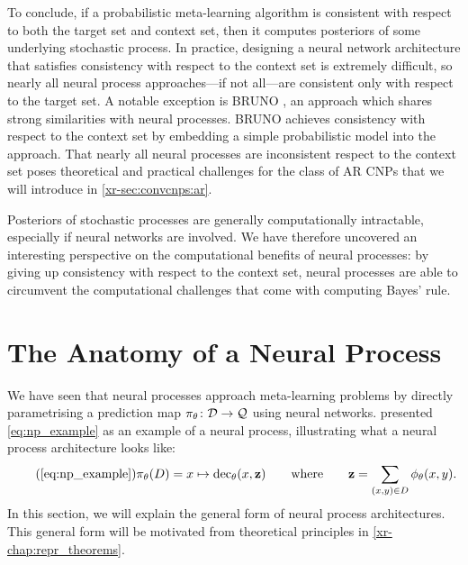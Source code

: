 \documentclass[12pt, twoside]{report}
\newcommand{\xrprefix}[1]{xr-#1}
\begin{document}
To conclude, if a probabilistic meta-learning algorithm is consistent with respect to both the target set and context set,
then it computes posteriors of some underlying stochastic process.
In practice, designing a neural network architecture that satisfies consistency with respect to the context set is extremely difficult, so nearly all neural process approaches---if not all---are consistent only with respect to the target set.
A notable exception is BRUNO \parencite{Korshunova:2018:BRUNO_A_Deep_Recurrent_Model,Korshunova:2020:Conditional_BRUNO_A_Neural_Process}, an approach which shares strong similarities with neural processes.
BRUNO achieves consistency with respect to the context set by embedding a simple probabilistic model into the approach.
That nearly all neural processes are inconsistent respect to the context set
poses theoretical and practical challenges for the class of AR CNPs
that we will introduce in \cref{\xrprefix{sec:convcnps:ar}}.

Posteriors of stochastic processes are generally computationally intractable, especially if neural networks are involved.
We have therefore uncovered an interesting perspective on the computational benefits of neural processes:
by giving up consistency with respect to the context set, neural processes are able to circumvent the 
 computational challenges that come with computing Bayes' rule.

\pagebreak
\section{The Anatomy of a Neural Process}
\label{sec:nps:anatomy}

We have seen that neural processes approach meta-learning problems by directly parametrising a prediction map $\pi_\theta \colon \mathcal{D} \to \mathcal{Q}$ using neural networks.
 presented \eqref{eq:np_example} as an example of a neural process, illustrating what a neural process architecture looks like:%
\begin{equation} \tag{\ref{eq:np_example}} \label{eq:np_example:duplicate}
    \pi_\theta(D) = x \mapsto \operatorname{dec}_\theta(x, \vz)
    \qquad \text{where} \qquad
    \vz = \sum_{(x, y) \in D} \phi_\theta(x, y).
\end{equation}
In this section, we will explain the general form of neural process architectures.
This general form will be motivated from theoretical principles in \cref{\xrprefix{chap:repr_theorems}}.
\end{document}
